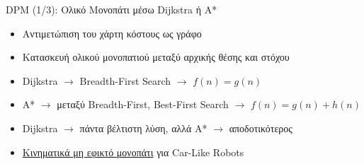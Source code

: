 \documentclass[10pt, compress, handout]{beamer} %
\begin{document}
\begin{frame}{DPM (1/3): Ολικό Μονοπάτι μέσω Dijkstra ή Α*}
	\begin{itemize}
		\item Αντιμετώπιση του χάρτη κόστους ως γράφο
		\item Κατασκευή ολικού μονοπατιού μεταξύ αρχικής θέσης και στόχου
		\item Dijkstra $\rightarrow$ Breadth-First Search $\rightarrow$ $f(n)=g(n)$
		\item Α* $\rightarrow$ μεταξύ Breadth-First, Best-First Search $\rightarrow$ $f(n)=g(n)+h(n)$
		\item Dijkstra $\rightarrow$ πάντα βέλτιστη λύση, αλλά Α* $\rightarrow$ αποδοτικότερος
		\item \underline{Κινηματικά μη εφικτό μονοπάτι} για Car-Like Robots
	\end{itemize}
	\vspace{-0.2cm}
	\begin{figure}
		\captionsetup[subfigure]{labelformat=empty}
		\hspace{1cm}
	\end{figure}
\end{frame}
\end{document}

